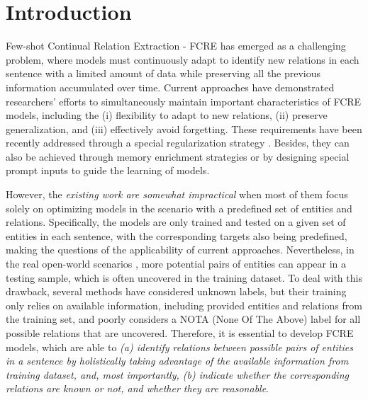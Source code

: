 \section{Introduction}


Few-shot Continual Relation Extraction - FCRE \citep{qin-joty-2022-continual, chen-etal-2023-consistent} has emerged as a challenging problem, where models must continuously adapt to identify new relations in each sentence with a limited amount of data while preserving all the previous information accumulated over time. Current approaches have demonstrated researchers' efforts to simultaneously maintain important characteristics of FCRE models, including the (i) flexibility to adapt to new relations, (ii) preserve generalization, and (iii) effectively avoid forgetting. These requirements have been recently addressed through a special regularization strategy \citep{tran-etal-2024-preserving, DBLP:conf/acl/WangWH23}. Besides, they can also be achieved through memory enrichment strategies \citep{ma-etal-2024-making} or by designing special prompt inputs \citep{DBLP:conf/acl/ChenWS23} to guide the learning of models.

However, the \textit{existing work are somewhat impractical} when most of them focus solely on optimizing models in {the scenario with a predefined set of entities and relations}. Specifically, the models are only trained and tested on a given set of entities in each sentence, with the corresponding targets also being predefined, making the questions of the applicability of current approaches. Nevertheless, in the real open-world scenarios \citep{DBLP:conf/www/XuLSY19, Mazumder2024}, more potential pairs of entities can appear in a testing sample, which is often uncovered in the training dataset. To deal with this drawback, several methods \citep{WANG2023151, zhao-etal-2025-dynamic, zhao-etal-2023-open, meng-etal-2023-rapl} have considered unknown labels, but their training only relies on available information, including provided entities and relations from the training set, and poorly considers a NOTA (None Of The Above) label for all possible relations that are uncovered. 
Therefore, it is essential to develop FCRE models, which are able to
\textit{(a) identify relations between possible pairs of entities in a sentence by holistically taking advantage of the available information from training dataset, and, most importantly, (b) indicate whether the corresponding relations are known or not, and whether they are reasonable}. 

